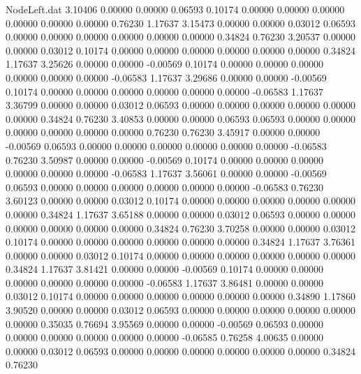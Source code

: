 \begin{filecontents}{NodeLeft.dat}
   3.10406    0.00000    0.00000     0.06593    0.10174    0.00000    0.00000    0.00000    0.00000    0.00000    0.00000    0.76230    1.17637
   3.15473    0.00000    0.00000     0.03012    0.06593    0.00000    0.00000    0.00000    0.00000    0.00000    0.00000    0.34824    0.76230
   3.20537    0.00000    0.00000     0.03012    0.10174    0.00000    0.00000    0.00000    0.00000    0.00000    0.00000    0.34824    1.17637
   3.25626    0.00000    0.00000    -0.00569    0.10174    0.00000    0.00000    0.00000    0.00000    0.00000    0.00000   -0.06583    1.17637
   3.29686    0.00000    0.00000    -0.00569    0.10174    0.00000    0.00000    0.00000    0.00000    0.00000    0.00000   -0.06583    1.17637
   3.36799    0.00000    0.00000     0.03012    0.06593    0.00000    0.00000    0.00000    0.00000    0.00000    0.00000    0.34824    0.76230
   3.40853    0.00000    0.00000     0.06593    0.06593    0.00000    0.00000    0.00000    0.00000    0.00000    0.00000    0.76230    0.76230
   3.45917    0.00000    0.00000    -0.00569    0.06593    0.00000    0.00000    0.00000    0.00000    0.00000    0.00000   -0.06583    0.76230
   3.50987    0.00000    0.00000    -0.00569    0.10174    0.00000    0.00000    0.00000    0.00000    0.00000    0.00000   -0.06583    1.17637
   3.56061    0.00000    0.00000    -0.00569    0.06593    0.00000    0.00000    0.00000    0.00000    0.00000    0.00000   -0.06583    0.76230
   3.60123    0.00000    0.00000     0.03012    0.10174    0.00000    0.00000    0.00000    0.00000    0.00000    0.00000    0.34824    1.17637
   3.65188    0.00000    0.00000     0.03012    0.06593    0.00000    0.00000    0.00000    0.00000    0.00000    0.00000    0.34824    0.76230
   3.70258    0.00000    0.00000     0.03012    0.10174    0.00000    0.00000    0.00000    0.00000    0.00000    0.00000    0.34824    1.17637
   3.76361    0.00000    0.00000     0.03012    0.10174    0.00000    0.00000    0.00000    0.00000    0.00000    0.00000    0.34824    1.17637
   3.81421    0.00000    0.00000    -0.00569    0.10174    0.00000    0.00000    0.00000    0.00000    0.00000    0.00000   -0.06583    1.17637
   3.86481    0.00000    0.00000     0.03012    0.10174    0.00000    0.00000    0.00000    0.00000    0.00000    0.00000    0.34890    1.17860
   3.90520    0.00000    0.00000     0.03012    0.06593    0.00000    0.00000    0.00000    0.00000    0.00000    0.00000    0.35035    0.76694
   3.95569    0.00000    0.00000    -0.00569    0.06593    0.00000    0.00000    0.00000    0.00000    0.00000    0.00000   -0.06585    0.76258
   4.00635    0.00000    0.00000     0.03012    0.06593    0.00000    0.00000    0.00000    0.00000    0.00000    0.00000    0.34824    0.76230

\end{filecontents}
